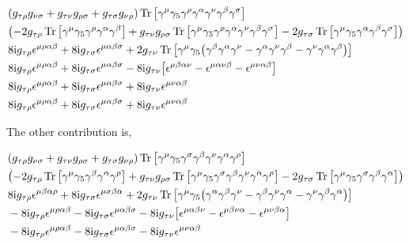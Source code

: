 \begin{align}
    &\qty(g_{\tau\rho}g_{\nu\sigma}+g_{\tau\nu}g_{\rho\sigma}+g_{\tau\sigma}g_{\nu\rho})\Tr\qty[\gamma^\mu\gamma_5\gamma^\rho\gamma^\alpha\gamma^\nu\gamma^\beta\gamma^\sigma]\nonumber\\
    &\qty(-2g_{\tau\rho}\Tr\qty[\gamma^\mu\gamma_5\gamma^\rho\gamma^\alpha\gamma^\beta]+g_{\tau\nu}g_{\rho\sigma}\Tr\qty[\gamma^\mu\gamma_5\gamma^\rho\gamma^\alpha\gamma^\nu\gamma^\beta\gamma^\sigma]-2g_{\tau\sigma}\Tr\qty[\gamma^\mu\gamma_5\gamma^\alpha\gamma^\beta\gamma^\sigma])\nonumber\\
    &8\textnormal{i} g_{\tau\rho}\epsilon^{\mu\rho\alpha\beta}+8\textnormal{i} g_{\tau\sigma}\epsilon^{\mu\alpha\beta\sigma}+2g_{\tau\nu}\Tr\qty[\gamma^\mu\gamma_5\qty(\gamma^\beta\gamma^\alpha\gamma^\nu-\gamma^\alpha\gamma^\nu\gamma^\beta-\gamma^\nu\gamma^\alpha\gamma^\beta)]\nonumber\\
    &8\textnormal{i} g_{\tau\rho}\epsilon^{\mu\rho\alpha\beta}+8\textnormal{i} g_{\tau\sigma}\epsilon^{\mu\alpha\beta\sigma}-8\textnormal{i} g_{\tau\nu}\qty[\epsilon^{\mu\beta\alpha\nu}-\epsilon^{\mu\alpha\nu\beta}-\epsilon^{\mu\nu\alpha\beta}]\nonumber\\
    &8\textnormal{i} g_{\tau\rho}\epsilon^{\mu\rho\alpha\beta}+8\textnormal{i} g_{\tau\sigma}\epsilon^{\mu\alpha\beta\sigma}+8\textnormal{i} g_{\tau\nu}\epsilon^{\mu\nu\alpha\beta}\nonumber\\
    &8\textnormal{i} g_{\tau\rho}\epsilon^{\mu\rho\alpha\beta}+8\textnormal{i} g_{\tau\sigma}\epsilon^{\mu\alpha\beta\sigma}+8\textnormal{i} g_{\tau\nu}\epsilon^{\mu\nu\alpha\beta}\nonumber
\end{align}

The other contribution is,

\begin{align}
    &\qty(g_{\tau\rho}g_{\nu\sigma}+g_{\tau\nu}g_{\rho\sigma}+g_{\tau\sigma}g_{\nu\rho})\Tr\qty[\gamma^\mu\gamma_5\gamma^\sigma\gamma^\beta\gamma^\nu\gamma^\alpha\gamma^\rho]\nonumber\\
    &\qty(-2g_{\tau\rho}\Tr\qty[\gamma^\mu\gamma_5\gamma^\beta\gamma^\alpha\gamma^\rho]+g_{\tau\nu}g_{\rho\sigma}\Tr\qty[\gamma^\mu\gamma_5\gamma^\sigma\gamma^\beta\gamma^\nu\gamma^\alpha\gamma^\rho]-2g_{\tau\sigma}\Tr\qty[\gamma^\mu\gamma_5\gamma^\sigma\gamma^\beta\gamma^\alpha])\nonumber\\
    &8\textnormal{i} g_{\tau\rho}\epsilon^{\mu\beta\alpha\rho}+8\textnormal{i} g_{\tau\sigma}\epsilon^{\mu\sigma\beta\alpha}+2g_{\tau\nu}\Tr\qty[\gamma^\mu\gamma_5\qty(\gamma^\alpha\gamma^\beta\gamma^\nu-\gamma^\beta\gamma^\nu\gamma^\alpha-\gamma^\nu\gamma^\beta\gamma^\alpha)]\nonumber\\
    &-8\textnormal{i} g_{\tau\rho}\epsilon^{\mu\rho\alpha\beta}-8\textnormal{i} g_{\tau\sigma}\epsilon^{\mu\alpha\beta\sigma}-8\textnormal{i} g_{\tau\nu}\qty[\epsilon^{\mu\alpha\beta\nu}-\epsilon^{\mu\beta\nu\alpha}-\epsilon^{\mu\nu\beta\alpha}]\nonumber\\
    &-8\textnormal{i} g_{\tau\rho}\epsilon^{\mu\rho\alpha\beta}-8\textnormal{i} g_{\tau\sigma}\epsilon^{\mu\alpha\beta\sigma}-8\textnormal{i} g_{\tau\nu}\epsilon^{\mu\nu\alpha\beta}\nonumber
\end{align}


